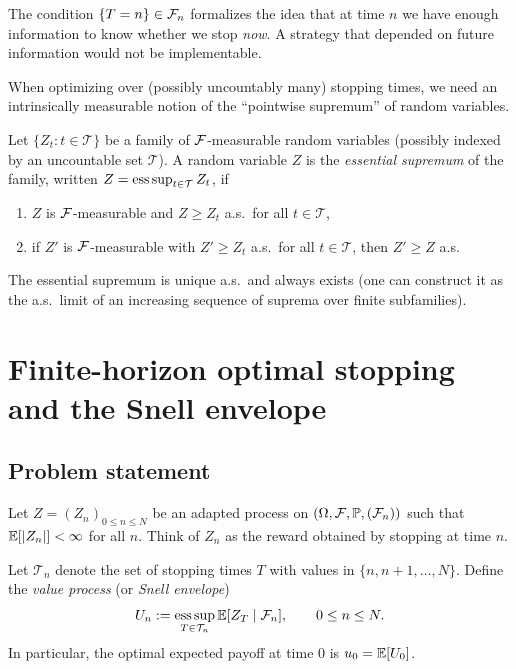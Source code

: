 \begin{remark}
The condition $\{T=n\}\in\mathcal{F}_n$ formalizes the idea that at time $n$ we have enough
information to know whether we stop \emph{now}. A strategy that depended on future information
would not be implementable.
\end{remark}

When optimizing over (possibly uncountably many) stopping times, we need an intrinsically measurable notion
of the ``pointwise supremum'' of random variables.

\begin{definition}
Let $\{Z_t:t\in\mathcal{T}\}$ be a family of $\mathcal{F}$-measurable random variables (possibly indexed by an
uncountable set $\mathcal{T}$). A random variable $Z$ is the \emph{essential supremum} of the family,
written $Z=\operatorname*{ess\,sup}_{t\in\mathcal{T}} Z_t$, if
\begin{enumerate}[label=(\roman*)]
\item $Z$ is $\mathcal{F}$-measurable and $Z\ge Z_t$ a.s.\ for all $t\in\mathcal{T}$,
\item if $Z'$ is $\mathcal{F}$-measurable with $Z'\ge Z_t$ a.s.\ for all $t\in\mathcal{T}$, then $Z'\ge Z$ a.s.
\end{enumerate}
\end{definition}

\begin{remark}
The essential supremum is unique a.s.\ and always exists (one can construct it as the a.s.\ limit of
an increasing sequence of suprema over finite subfamilies).
\end{remark}

\section{Finite-horizon optimal stopping and the Snell envelope}

\subsection{Problem statement}

Let $Z=(Z_n)_{0\le n\le N}$ be an adapted process on $(\Omega,\mathcal{F},\mathbb{P},(\mathcal{F}_n))$ such that
$\mathbb{E}[|Z_n|]<\infty$ for all $n$. Think of $Z_n$ as the reward obtained by stopping at time $n$.

Let $\mathcal{T}_n$ denote the set of stopping times $T$ with values in $\{n,n+1,\dots,N\}$.
Define the \emph{value process} (or \emph{Snell envelope})
\begin{equation}\label{eq:Snell}
U_n := \operatorname*{ess\,sup}_{T\in\mathcal{T}_n}\mathbb{E}[Z_T\mid \mathcal{F}_n], \qquad 0\le n\le N.
\end{equation}
In particular, the optimal expected payoff at time $0$ is $u_0=\mathbb{E}[U_0]$.

